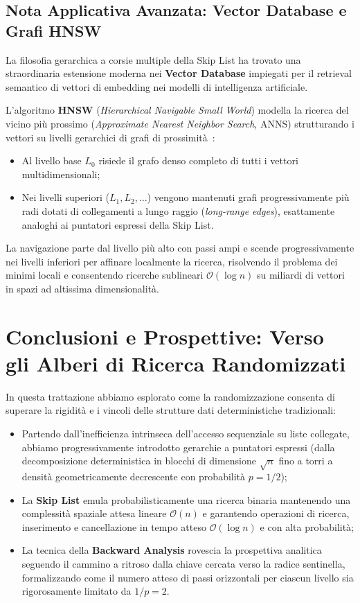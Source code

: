 \subsection{Nota Applicativa Avanzata: Vector Database e Grafi HNSW}
La filosofia gerarchica a corsie multiple della Skip List ha trovato una straordinaria estensione moderna nei \textbf{Vector Database} impiegati per il retrieval semantico di vettori di embedding nei modelli di intelligenza artificiale.

L'algoritmo \textbf{HNSW} (\textit{Hierarchical Navigable Small World}) modella la ricerca del vicino più prossimo (\textit{Approximate Nearest Neighbor Search}, ANNS) strutturando i vettori su livelli gerarchici di grafi di prossimità~\cite{malkov2020}:
\begin{itemize}
  \item Al livello base $L_0$ risiede il grafo denso completo di tutti i vettori multidimensionali;
  \item Nei livelli superiori ($L_1, L_2, \dots$) vengono mantenuti grafi progressivamente più radi dotati di collegamenti a lungo raggio (\textit{long-range edges}), esattamente analoghi ai puntatori espressi della Skip List.
\end{itemize}
La navigazione parte dal livello più alto con passi ampi e scende progressivamente nei livelli inferiori per affinare localmente la ricerca, risolvendo il problema dei minimi locali e consentendo ricerche sublineari $\mathcal{O}(\log n)$ su miliardi di vettori in spazi ad altissima dimensionalità.

\FloatBarrier
\section{Conclusioni e Prospettive: Verso gli Alberi di Ricerca Randomizzati}
\label{sec:skip-list-conclusions}

In questa trattazione abbiamo esplorato come la randomizzazione consenta di superare la rigidit\`a e i vincoli delle strutture dati deterministiche tradizionali:
\begin{itemize}
  \item Partendo dall'inefficienza intrinseca dell'accesso sequenziale su liste collegate, abbiamo progressivamente introdotto gerarchie a puntatori espressi (dalla decomposizione deterministica in blocchi di dimensione $\sqrt{n}$ fino a torri a densit\`a geometricamente decrescente con probabilit\`a $p = 1/2$);
  \item La \textbf{Skip List} emula probabilisticamente una ricerca binaria mantenendo una complessit\`a spaziale attesa lineare $\mathcal{O}(n)$ e garantendo operazioni di ricerca, inserimento e cancellazione in tempo atteso $\mathcal{O}(\log n)$ e con alta probabilit\`a;
  \item La tecnica della \textbf{Backward Analysis} rovescia la prospettiva analitica seguendo il cammino a ritroso dalla chiave cercata verso la radice sentinella, formalizzando come il numero atteso di passi orizzontali per ciascun livello sia rigorosamente limitato da $1/p = 2$.
\end{itemize}

